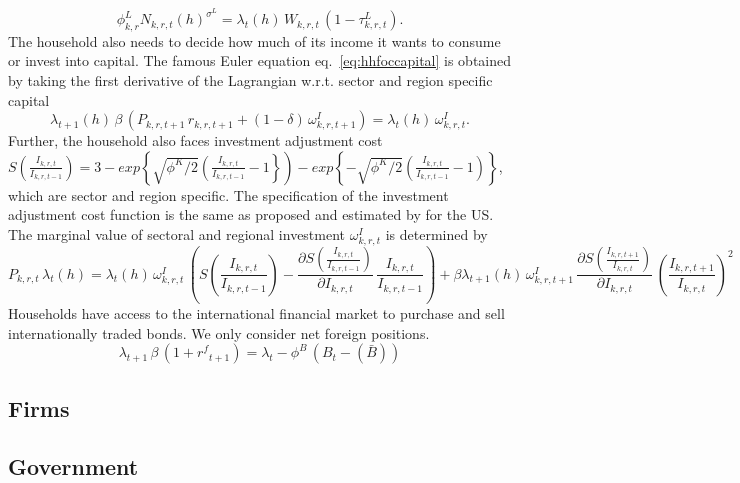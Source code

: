 \documentclass[10pt,a4paper]{article}
\begin{document}
\begin{dmath}\label{eq:hhlaboursupply}
\phi^{L}_{k,r} N_{k,r,t}(h)^{\sigma^{L}} = \lambda_{t}(h) \, W_{k,r,t} \, (1 - \tau^{L}_{k,r,t}).
\end{dmath}
The household also needs to decide how much of its income it wants to consume or invest into capital. The famous Euler equation eq.~\ref{eq:hhfoccapital} is obtained by taking the first derivative of the Lagrangian w.r.t. sector and region specific capital
\begin{dmath}\label{eq:hhfoccapital}
\lambda_{t+1}(h) \, \beta \, \left(P_{k,r,t+1} \, r_{k,r,t+1} + (1 - \delta) \, \omega^{I}_{k,r,t+1} \right) = \lambda_{t}(h) \, \omega^{I}_{k,r,t}.
\end{dmath}
Further, the household also faces investment adjustment cost $S(\frac{I_{k,r,t}}{I_{k,r,t-1}}) = 3 - exp\left\lbrace\sqrt{\phi^{K}/2}\left(\frac{I_{k,r,t}}{I_{k,r,t-1}}-1\right\rbrace\right) - exp\left\lbrace-\sqrt{\phi^{K}/2}\left(\frac{I_{k,r,t}}{I_{k,r,t-1}}-1\right)\right\rbrace$, which are sector and region specific. The specification of the investment adjustment cost function is the same as proposed and estimated by \cite{christiano2014risk} for the US.  The marginal value of sectoral and regional investment $\omega^{I}_{k,r,t}$ is determined by
\begin{dmath}\label{eq:hhfocinvestment}
P_{k,r,t} \, \lambda_{t}(h) = \lambda_{t}(h) \, \omega^{I}_{k,r,t} \, \left(S(\frac{I_{k,r,t}}{I_{k,r,t-1}}) - \frac{\partial S(\frac{I_{k,r,t}}{I_{k,r,t-1}})}{\partial I_{k,r,t}} \, \frac{I_{k,r,t}}{I_{k,r,t-1}} \right) + \beta \lambda_{t+1}(h) \, \omega^{I}_{k,r,t+1} \, \frac{\partial S(\frac{I_{k,r,t+1}}{I_{k,r,t}})}{\partial I_{k,r,t}} \, \left(\frac{I_{k,r,t+1}}{I_{k,r,t}}\right)^2
\end{dmath}
Households have access to the international financial market to purchase and sell internationally traded bonds. We only consider net foreign positions.
\begin{dmath}
\lambda_{t+1} \, \beta \, \left(1+{{r^{f}}_{t+1}}\right) = \lambda_{t}-{{\phi^{B}}}\, \left({B_{t}}-(\bar{B})\right)
\end{dmath}
\subsection{Firms}

\subsection{Government}
\end{document}
